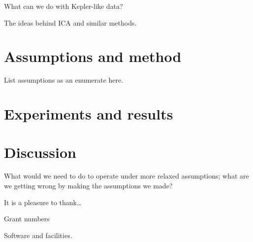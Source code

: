 \documentclass[modern]{aastex61}
\begin{document}
What can we do with Kepler-like data?

The ideas behind ICA and similar methods.

\section{Assumptions and method}

List assumptions as an enumerate here.

\section{Experiments and results}

\section{Discussion}

What would we need to do to operate under more relaxed assumptions; what are
we getting wrong by making the assumptions we made?

\acknowledgements
It is a pleasure to thank\ldots

Grant numbers

Software and facilities.
\end{document}
